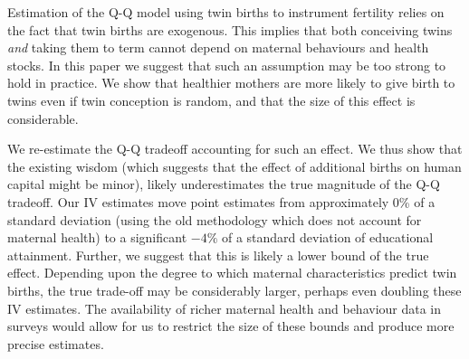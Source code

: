 Estimation of the Q-Q model using twin births to instrument fertility relies on 
the fact that twin births are exogenous. This implies that both conceiving twins 
\emph{and} taking them to term cannot depend on maternal behaviours and health 
stocks. In this paper we suggest that such an assumption may be too strong to 
hold in practice. We show that healthier mothers are more likely to give birth to 
twins even if twin conception is random, and that the size of this effect is 
considerable.

We re-estimate the Q-Q tradeoff accounting for such an effect.  We thus show
that the existing wisdom (which suggests that the effect of additional births 
on human capital might be minor), likely underestimates the true magnitude of
the Q-Q tradeoff.  Our IV estimates move point estimates from approximately 
0\% of a standard deviation (using the old methodology which does not account
for maternal health) to a significant $-4\%$ of a standard deviation of 
educational attainment.  Further, we suggest that this is likely
a lower bound of the true effect.  Depending upon the degree to which maternal
characteristics predict twin births, the true trade-off may be considerably
larger, perhaps even doubling these IV estimates.  The availability of richer 
maternal health and behaviour data in surveys would allow for us to restrict
the size of these bounds and produce more precise estimates.

